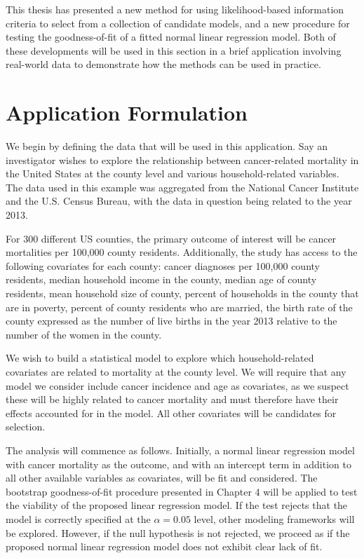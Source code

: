 \doublespace
{}

		This thesis has presented a new method for using likelihood-based information criteria to select from a collection of candidate models, and a new procedure
		for testing the goodness-of-fit of a fitted normal linear regression model. Both of these developments will be used in this section in a brief application
		involving real-world data to demonstrate how the methods can be used in practice.

		\section{Application Formulation} \label{sec:app_form}

		We begin by defining the data that will be used in this application. Say an investigator wishes to explore the relationship between cancer-related mortality in
		the United States at the county level and various household-related variables. The data used in this example was aggregated from the National Cancer Institute
		and the U.S. Census Bureau, with the data in question being related to the year 2013.
		
		For 300 different US counties, the primary outcome of interest will be cancer mortalities per 100,000 county residents. Additionally, the study has access to the
		following covariates for each county: cancer diagnoses per 100,000 county residents, median household income in the county, median age of county residents, mean
		household size of county, percent of households in the county that are in poverty, percent of county residents who are married, the birth rate of the county expressed
		as the number of live births in the year 2013 relative to the number of the women in the county.

		We wish to build a statistical model to explore which household-related covariates are related to mortality at the county level. We will require that any model we
		consider include cancer incidence and age as covariates, as we suspect these will be highly related to cancer mortality and must therefore have their effects
		accounted for in the model. All other covariates will be candidates for selection.

		The analysis will commence as follows. Initially, a normal linear regression model with cancer mortality as the outcome, and with an intercept term in addition to all
		other available variables as covariates, will be fit and considered. The bootstrap goodness-of-fit procedure presented in Chapter 4 will be applied to test the 
		viability of the proposed linear regression model. If the test rejects that the model is correctly specified at the $\alpha = 0.05$ level, other modeling frameworks
		will be explored. However, if the null hypothesis is not rejected, we proceed as if the proposed normal linear regression model does not exhibit clear lack of fit.

